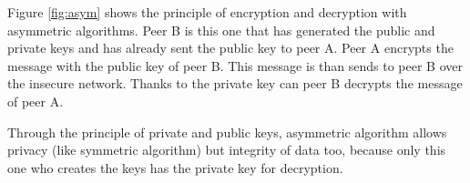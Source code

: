 Figure \ref{fig:asym} shows the principle of encryption and decryption with
asymmetric algorithms.\newline
Peer B is this one that has generated the public and private keys and has already
sent the public key to peer A.\newline
Peer A encrypts the message with the public key of peer B. This
message is than sends to peer B over the insecure network.\newline
Thanks to the private key can peer B decrypts the message of peer A.\newline

Through the principle of private and public keys, asymmetric algorithm allows
privacy (like symmetric algorithm) but integrity of data too, because only this
one who creates the keys has the private key for decryption.

\newpage

